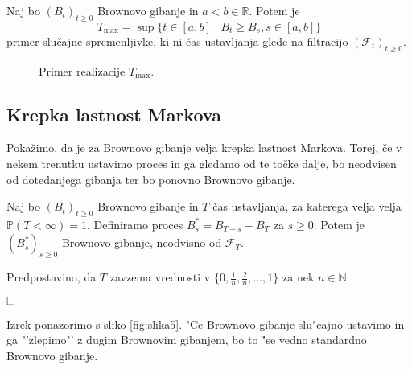 \documentclass[twoside,11pt]{article}
\begin{document}
\begin{primer}
    Naj bo $(B_t)_{t\geq0}$ Brownovo gibanje in $a < b \in \mathbb{R}$. Potem je
    $$
        T_{\max} = \sup\{t \in [a, b] \mid B_t \geq B_s, s\in[a, b] \}
    $$
    primer slučajne spremenljivke, ki ni čas ustavljanja glede na filtracijo $(\mathcal{F}_t)_{t\geq0}$.
\end{primer}

\begin{figure}[h]
    \centering
    \caption{Primer realizacije $T_{\max}$.}
    \label{fig:slika4}
\end{figure}

\subsection{Krepka lastnost Markova}
Pokažimo, da je za Brownovo gibanje velja krepka lastnost Markova. Torej, če 
v nekem trenutku ustavimo proces in ga gledamo od te točke dalje, bo neodvisen od
dotedanjega gibanja ter bo ponovno Brownovo gibanje.

\begin{izrek}
    Naj bo $(B_t)_{t\geq 0}$ Brownovo gibanje in $T$ čas ustavljanja, za katerega velja velja $\mathbb{P}(T<\infty )=1$.
    Definiramo proces $B^*_s = B_{T + s} - B_T$ za $s\geq0$. Potem je $(B^*_s)_{s\geq0}$ Brownovo
    gibanje, neodvisno od $\mathcal{F}_T$.
\end{izrek}

\begin{dokaz}
    Predpostavino, da $T$ zavzema vrednosti v $\{0, \frac{1}{n}, \frac{2}{n}, \dots, 1\}$ za nek $n\in\mathbb{N}$. 
    
     $\hfill \square$
\end{dokaz}

Izrek ponazorimo s sliko \ref{fig:slika5}. "Ce Brownovo gibanje slu"cajno ustavimo in ga "'zlepimo"' z dugim Brownovim gibanjem, bo to "se vedno standardno Brownovo gibanje. 
\end{document}
